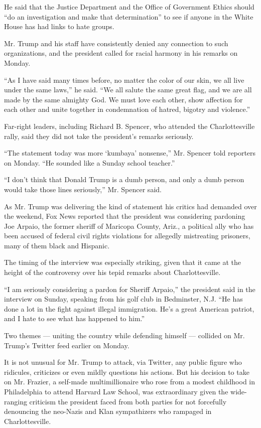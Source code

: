 He said that the Justice Department and the Office of Government Ethics
should ``do an investigation and make that determination'' to see if
anyone in the White House has had links to hate groups.

Mr. Trump and his staff have consistently denied any connection to such
organizations, and the president called for racial harmony in his
remarks on Monday.

``As I have said many times before, no matter the color of our skin, we
all live under the same laws,'' he said. ``We all salute the same great
flag, and we are all made by the same almighty God. We must love each
other, show affection for each other and unite together in condemnation
of hatred, bigotry and violence.''

Far-right leaders, including Richard B. Spencer, who attended the
Charlottesville rally, said they did not take the president's remarks
seriously.

``The statement today was more `kumbaya' nonsense,'' Mr. Spencer told
reporters on Monday. ``He sounded like a Sunday school teacher.''

``I don't think that Donald Trump is a dumb person, and only a dumb
person would take those lines seriously,'' Mr. Spencer said.

As Mr. Trump was delivering the kind of statement his critics had
demanded over the weekend, Fox News reported that the president was
considering pardoning Joe Arpaio, the former sheriff of Maricopa County,
Ariz., a political ally who has been accused of federal civil rights
violations for allegedly mistreating prisoners, many of them black and
Hispanic.

The timing of the interview was especially striking, given that it came
at the height of the controversy over his tepid remarks about
Charlottesville.

``I am seriously considering a pardon for Sheriff Arpaio,'' the
president said in the interview on Sunday, speaking from his golf club
in Bedminster, N.J. ``He has done a lot in the fight against illegal
immigration. He's a great American patriot, and I hate to see what has
happened to him.''

Two themes --- uniting the country while defending himself --- collided
on Mr. Trump's Twitter feed earlier on Monday.

It is not unusual for Mr. Trump to attack, via Twitter, any public
figure who ridicules, criticizes or even mildly questions his actions.
But his decision to take on Mr. Frazier, a self-made multimillionaire
who rose from a modest childhood in Philadelphia to attend Harvard Law
School, was extraordinary given the wide-ranging criticism the president
faced from both parties for not forcefully denouncing the neo-Nazis and
Klan sympathizers who rampaged in Charlottesville.

